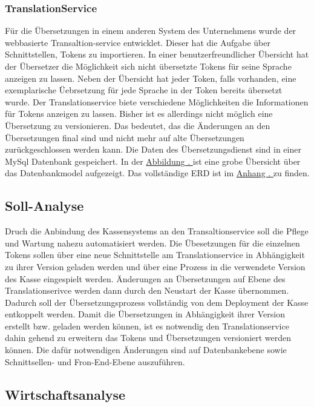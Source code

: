 \documentclass[10pt, oneside]{article}
\newcommand{\figsecref}[1]{\hyperref[{#1}]{Abbildung \thesubsection. \nameref*{#1}}}
\newcommand{\attsecref}[1]{\hyperref[{#1}]{Anhang \thesubsection. \nameref*{#1}}}
\begin{document}
  \subsubsection{TranslationService}\label{sec:analyse:current:ts}%
    Für die Übersetzungen in einem anderen System des Unternehmens wurde der webbasierte Transaltion-service entwicklet. 
    Dieser hat die Aufgabe über Schnittstellen, Tokens zu importieren.
    In einer benutzerfreundlicher Übersicht hat der Übersetzer die Möglichkeit sich nicht übersetzte Tokens für seine Sprache anzeigen zu lassen.
    Neben der Übersicht hat jeder Token, falls vorhanden, eine exemplarische Üebrsetzung für jede Sprache in der Token bereits übersetzt wurde.
    Der Translationservice biete verschiedene Möglichkeiten die Informationen für Tokens anzeigen zu lassen. 
    Bisher ist es allerdings nicht möglich eine Übersetzung zu versionieren. Das bedeutet, das die Änderungen an den Übersetzungen final sind und nicht 
    mehr auf alte Übersetzungen zurückgeschlossen werden kann.
    Die Daten des Übersetzungsdienst sind in einer MySql Datenbank gespeichert. In der \figsecref{abb:erdIs1} ist eine grobe Übersicht über das Datenbankmodel aufgezeigt. 
    Das vollständige ERD ist im \attsecref{sec:isErd} zu finden.
  
  \subsection{Soll-Analyse}%
    Druch die Anbindung des Kassensystems an den Transaltionservice soll die Pflege und Wartung nahezu automatisiert werden. 
    Die Übesetzungen für die einzelnen Tokens sollen über eine neue Schnittstelle am Translationservice in Abhängigkeit zu ihrer Version geladen werden 
    und über eine Prozess in die verwendete Version des Kasse eingespielt werden. Änderungen an Übersetzungen auf Ebene des Translationserivce werden dann
    durch den Neustart der Kasse übernommen. Dadurch soll der Übersetzungsprozess vollständig von dem Deployment der Kasse entkoppelt werden.
    Damit die Übersetzungen in Abhängigkeit ihrer Version erstellt bzw. geladen werden können, ist es notwendig den Translationservice dahin gehend zu erweitern
    das Tokens und Übersetzungen versioniert werden können. Die dafür notwendigen Änderungen sind auf Datenbankebene sowie Schnittsellen- und Fron-End-Ebene auszuführen.
  \subsection{Wirtschaftsanalyse}
\end{document}
